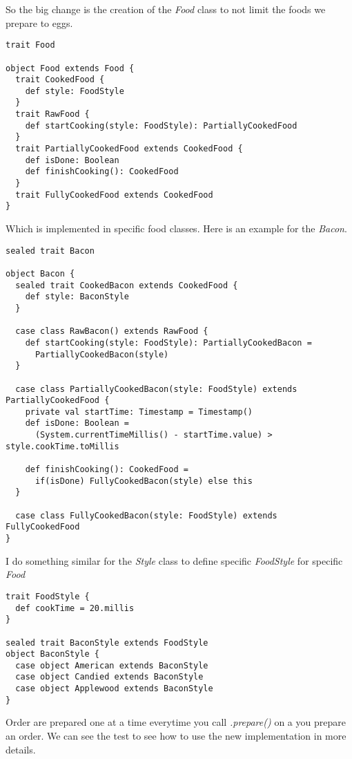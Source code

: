 \documentclass[a4paper,11pt]{article}
\begin{document}
So the big change is the creation of the \emph{Food} class to not limit the foods
we prepare to eggs.

\begin{lstlisting}[style=scala]
trait Food

object Food extends Food {
  trait CookedFood {
    def style: FoodStyle
  }
  trait RawFood {
    def startCooking(style: FoodStyle): PartiallyCookedFood
  }
  trait PartiallyCookedFood extends CookedFood {
    def isDone: Boolean
    def finishCooking(): CookedFood
  }
  trait FullyCookedFood extends CookedFood
}
\end{lstlisting}

Which is implemented in specific food classes. Here is an example for the
\emph{Bacon}.

\begin{lstlisting}[style=scala]
sealed trait Bacon

object Bacon {
  sealed trait CookedBacon extends CookedFood {
    def style: BaconStyle
  }

  case class RawBacon() extends RawFood {
    def startCooking(style: FoodStyle): PartiallyCookedBacon =
      PartiallyCookedBacon(style)
  }

  case class PartiallyCookedBacon(style: FoodStyle) extends PartiallyCookedFood {
    private val startTime: Timestamp = Timestamp()
    def isDone: Boolean =
      (System.currentTimeMillis() - startTime.value) > style.cookTime.toMillis

    def finishCooking(): CookedFood =
      if(isDone) FullyCookedBacon(style) else this
  }

  case class FullyCookedBacon(style: FoodStyle) extends FullyCookedFood
}
\end{lstlisting}

I do something similar for the \emph{Style} class to define specific \emph{FoodStyle}
for specific \emph{Food}

\begin{lstlisting}[style=scala]
trait FoodStyle {
  def cookTime = 20.millis
}

sealed trait BaconStyle extends FoodStyle
object BaconStyle {
  case object American extends BaconStyle
  case object Candied extends BaconStyle
  case object Applewood extends BaconStyle
}
\end{lstlisting}

Order are prepared one at a time everytime you call \emph{.prepare()} on a
you prepare an order. We can see the test to see how to use the new implementation
in more details.
\end{document}
